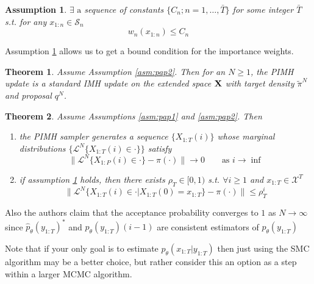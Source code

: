 \documentclass{article}\usepackage[]{graphicx}\usepackage[]{color}
\newtheorem{assumption}{Assumption}
\newtheorem{theorem}{Theorem}
\theoremstyle{definition}
\begin{document}
\begin{assumption}\label{asm:pap3}
$\exists\text{ a}$ sequence of constants $\{ C_n; n = 1,\ldots,\bar{T} \}$ for some integer $\bar{T}$ s.t. for any $x_{1:n} \in \mathcal{S}_n$
\begin{equation}
w_n(x_{1:n}) \leq C_n
\end{equation}
\end{assumption}

Assumption \ref{asm:pap3} allows us to get a bound condition for the importance weights.


\begin{theorem}
Assume Assumption \ref{asm:pap2}. Then for an $N \geq 1$, the PIMH update is a standard IMH update on the extended space ${\bf X}$ with target density $\tilde{\pi}^N$ and proposal $q^N$.
\end{theorem}


\begin{theorem}
Assume Assumptions \ref{asm:pap1} and \ref{asm:pap2}. Then 
\begin{enumerate}
  \item the PIMH sampler generates a sequence $\{ X_{1:T}(i) \}$ whose marginal distributions $\{ \mathcal{L}^N \{ X_{1:T}(i) \in \cdot \} \}$ satisfy 
    \begin{equation*}
    \| \mathcal{L}^N \{ X_{1:P}(i) \in \cdot \} - \pi(\cdot) \| \rightarrow 0 \quad \quad \text{as }i \rightarrow \inf
    \end{equation*}
  \item if assumption \ref{asm:pap3} holds, then there exists $\rho_T \in [0,1)$ s.t. $\forall i \geq 1$ and $x_{1:T} \in \mathcal{X}^T$ 
    \begin{equation*}
    \| \mathcal{L}^N \{ X_{1:T}(i) \in \cdot | X_{1:T}(0)=x_{1:T} \} - \pi(\cdot) \| \leq \rho^i_T
    \end{equation*}
\end{enumerate}
\end{theorem}



Also the authors claim that the acceptance probability converges to $1$ as $N \rightarrow \infty$ since $\hat{p}_\theta(y_{1:T})^*$ and $\hat{p}_\theta(y_{1:T})(i-1)$ are consistent estimators of $p_\theta(y_{1:T})$

Note that if your only goal is to estimate $p_\theta(x_{1:T}|y_{1:T})$ then just using the SMC algorithm may be a better choice, but rather consider this an option as a step within a larger MCMC algorithm.
\end{document}
